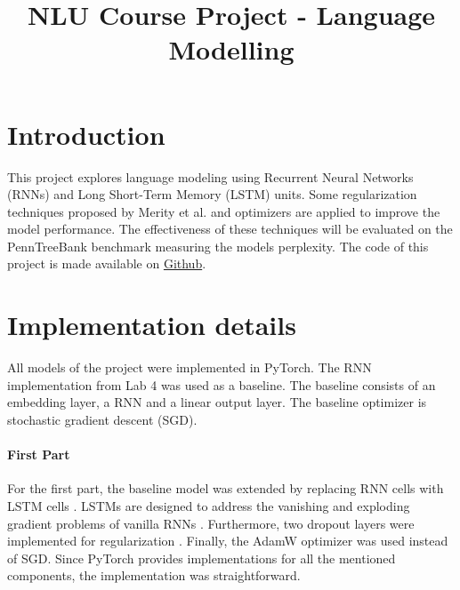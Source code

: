 \documentclass[a4paper]{article}
\title{NLU Course Project - Language Modelling}
\begin{document}
\maketitle


\section{Introduction}
This project explores language modeling using Recurrent Neural Networks (RNNs) and Long Short-Term Memory (LSTM) units. Some regularization techniques proposed by Merity et al. \cite{merity2017regularizing} and optimizers are applied to improve the model performance. The effectiveness of these techniques will be evaluated on the PennTreeBank benchmark measuring the models perplexity. The code of this project is made available on \href{https://github.com/chrisdalvit/nlu-assignment}{Github}.

\section{Implementation details}
\label{sec:implementation}
All models of the project were implemented in PyTorch. The RNN implementation from Lab 4 was used as a baseline. The baseline consists of an embedding layer, a RNN and a linear output layer. The baseline optimizer is stochastic gradient descent (SGD). 
\paragraph*{First Part}
For the first part, the baseline model was extended by replacing RNN cells with LSTM cells \cite{hochreiter1997long}. LSTMs are designed to address the vanishing and exploding gradient problems of vanilla RNNs \cite{sak2014long}. Furthermore, two dropout layers were implemented for regularization \cite{srivastava2014dropout}. Finally, the AdamW \cite{loshchilov2017decoupled} optimizer was used instead of SGD. Since PyTorch provides implementations for all the mentioned components, the implementation was straightforward.
\end{document}
